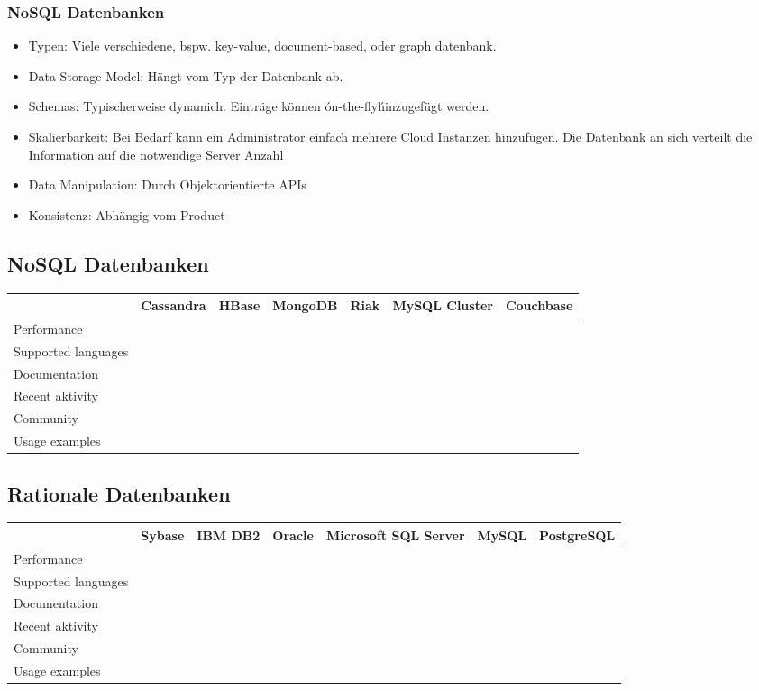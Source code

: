 		\subsubsection{NoSQL Datenbanken}
			\begin{itemize}
				\item Typen: Viele verschiedene, bspw. key-value, document-based, oder graph datenbank.
				\item Data Storage Model: Hängt vom Typ der Datenbank ab.
				\item Schemas: Typischerweise dynamich. Einträge können \'on-the-fly\' hinzugefügt werden.
				\item Skalierbarkeit: Bei Bedarf kann ein Administrator einfach mehrere Cloud Instanzen hinzufügen. Die Datenbank an sich verteilt die Information auf die notwendige Server Anzahl
				\item Data Manipulation: Durch Objektorientierte APIs
				\item Konsistenz: Abhängig vom Product
			\end{itemize}

	\subsection{NoSQL Datenbanken}

		\begin{tabular} {| l | c | c | c | c | c | c |}
			\hline
			& Cassandra & HBase & MongoDB & Riak & MySQL Cluster & Couchbase		\\ \hline \hline
			Performance &  &	 &  &  &  &  &		\\ \hline
			Supported languages &  &	 &  &  &  &  &	 			\\ \hline
			Documentation &  &	 &  &  &  &  &	 		\\ \hline
			Recent aktivity &  &	 &  &  &  &  &			\\ \hline
			Community &  &  &  &  &  &  &		\\ \hline 
			Usage examples	&  &	&  &  &  &  &					\\ \hline
		\end{tabular}

	\subsection{Rationale Datenbanken}
		
		\begin{tabular} {| l | c | c | c | c | c | c |}
			\hline
			& Sybase & IBM DB2 & Oracle & Microsoft SQL Server & MySQL & PostgreSQL	\\ \hline \hline
			Performance &  &	 &  &  &  &  &		\\ \hline
			Supported languages &  &	 &  &  &  &  &	 			\\ \hline
			Documentation &  &	 &  &  &  &  &	 		\\ \hline
			Recent aktivity &  &	 &  &  &  &  &			\\ \hline
			Community &  &  &  &  &  &  &		\\ \hline 
			Usage examples	&  &	&  &  &  &  &					\\ \hline
		\end{tabular}


